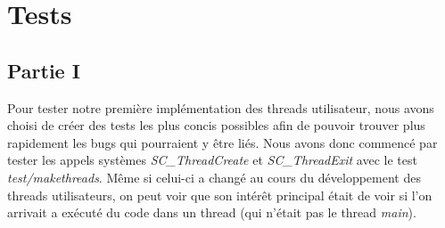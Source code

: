 \documentclass{article}
\begin{document}
\section{Tests}
\subsection{Partie I}
Pour tester notre première implémentation des threads utilisateur, nous avons choisi de créer des tests les plus concis possibles
afin de pouvoir trouver plus rapidement les bugs qui pourraient y être liés. Nous avons donc commencé par tester les appels systèmes
\textit{SC\_ThreadCreate} et \textit{SC\_ThreadExit} avec le test \textit{test/makethreads}. Même si celui-ci a changé au cours du 
développement des threads utilisateurs, on peut voir que son intérêt principal était de voir si l'on arrivait a exécuté du code dans
un thread (qui n'était pas le thread \textit{main}). 
\end{document}
